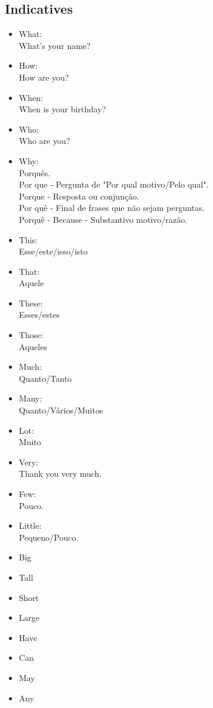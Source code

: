 \documentclass[12pt,a4paper]{article} %
\begin{document}
\subsection{Indicatives}
\begin{itemize}
\item What:\\ What's your name?
\item How:\\ How are you?
\item When:\\ When is your birthday?
\item Who:\\Who are you?
\item Why:\\ Porquês.\\
Por que - Pergunta de "Por qual motivo/Pelo qual".\\
Porque - Resposta ou conjunção.\\
Por quê - Final de frases que não sejam perguntas.\\
Porquê - Because - Substantivo motivo/razão.
\item This:\\ Esse/este/isso/isto
\item That:\\ Aquele
\item These:\\ Esses/estes
\item Those:\\ Aqueles
\item Much:\\ Quanto/Tanto
\item Many:\\ Quanto/Vários/Muitos
\item Lot:\\ Muito
\item Very:\\ Thank you very much.
\item Few:\\ Pouco.
\item Little:\\ Pequeno/Pouco.
\item Big
\item Tall
\item Short
\item Large
\item Have
\item Can
\item May
\item Any

\end{itemize}
\end{document}
